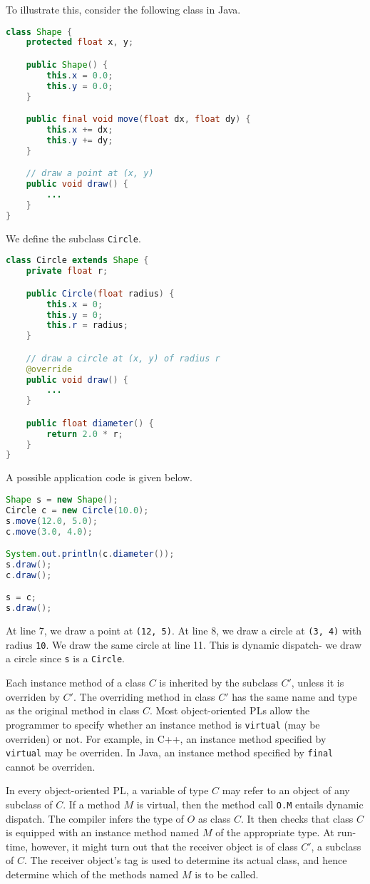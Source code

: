 \documentclass[a4paper, openany]{memoir}
\begin{document}
To illustrate this, consider the following class in Java.
\begin{lstlisting}[language=java]
class Shape {
    protected float x, y;

    public Shape() {
        this.x = 0.0;
        this.y = 0.0;
    }

    public final void move(float dx, float dy) {
        this.x += dx;
        this.y += dy;
    }

    // draw a point at (x, y)
    public void draw() {
        ...
    }
}
\end{lstlisting}
We define the subclass \texttt{Circle}.
\begin{lstlisting}[language=java]
class Circle extends Shape {
    private float r;

    public Circle(float radius) {
        this.x = 0;
        this.y = 0;
        this.r = radius;
    }

    // draw a circle at (x, y) of radius r
    @override
    public void draw() {
        ...
    }

    public float diameter() {
        return 2.0 * r;
    }
}
\end{lstlisting}
A possible application code is given below.
\begin{lstlisting}[language=java]
Shape s = new Shape();
Circle c = new Circle(10.0);
s.move(12.0, 5.0);
c.move(3.0, 4.0);

System.out.println(c.diameter());
s.draw();
c.draw();

s = c;
s.draw();
\end{lstlisting}
At line 7, we draw a point at \texttt{(12, 5)}. At line 8, we draw a circle at \texttt{(3, 4)} with radius \texttt{10}. We draw the same circle at line 11. This is dynamic dispatch- we draw a circle since \texttt{s} is a \texttt{Circle}.

Each instance method of a class $C$ is inherited by the subclass $C'$, unless it is overriden by $C'$. The overriding method in class $C'$ has the same name and type as the original method in class $C$. Most object-oriented PLs allow the programmer to specify whether an instance method is \texttt{virtual} (may be overriden) or not. For example, in C++, an instance method specified by \texttt{virtual} may be overriden. In Java, an instance method specified by \texttt{final} cannot be overriden.

In every object-oriented PL, a variable of type $C$ may refer to an object of any subclass of $C$. If a method $M$ is virtual, then the method call \texttt{O.M} entails dynamic dispatch. The compiler infers the type of $O$ as class $C$. It then checks that class $C$ is equipped with an instance method named $M$ of the appropriate type. At run-time, however, it might turn out that the receiver object is of class $C'$, a subclass of $C$. The receiver object's tag is used to determine its actual class, and hence determine which of the methods named $M$ is to be called.
\end{document}
